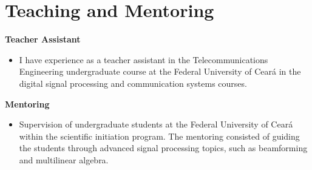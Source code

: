 \section{Teaching and Mentoring}

{\bf Teacher Assistant}\\
\begin{itemize}
	\item[] I have experience as a teacher assistant in the Telecommunications Engineering undergraduate course at the Federal University of Cear\'a in the digital signal processing and communication systems courses.
\end{itemize}

\newpage
{\bf Mentoring}\\
\begin{itemize}
	\item[] Supervision of undergraduate students at the Federal University of Cear\'a within the scientific initiation program. The mentoring consisted of guiding the students through advanced signal processing topics, such as beamforming and multilinear algebra.
\end{itemize}
